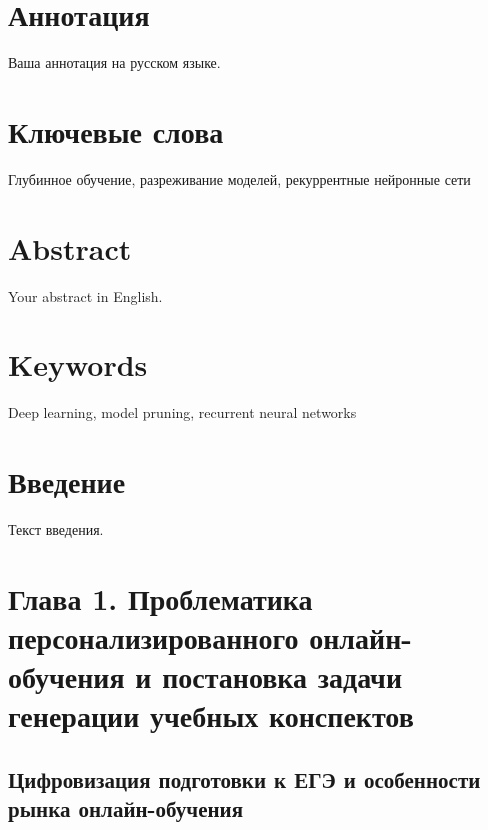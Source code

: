 \documentclass[a4paper,12pt]{extarticle}
\begin{document}
\newpage
\setcounter{page}{2}

{
	\hypersetup{linkcolor=black}
	\tableofcontents
}

\newpage

\newpage
\section*{Аннотация}   %
Ваша аннотация на русском языке.


\section*{Ключевые слова}
Глубинное обучение, разреживание моделей, рекуррентные нейронные сети
\pagebreak


\section*{Abstract}   %
Your abstract in English.


\section*{Keywords}
Deep learning, model pruning, recurrent neural networks
\pagebreak


\section*{Введение}
Текст введения.
\pagebreak


\section{
    Глава 1. Проблематика персонализированного онлайн-обучения 
    и постановка задачи генерации учебных конспектов
}

\subsection{Цифровизация подготовки к ЕГЭ и особенности рынка онлайн-обучения}
\end{document}
